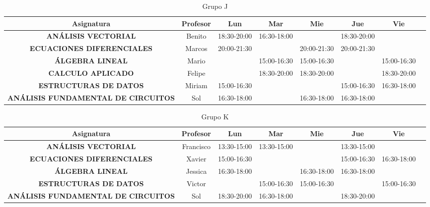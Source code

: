 \documentclass[10pt,letterpaper,twoside,openright]{article}
\begin{document}
	\begin{table}[h!]
		\centering
		\begin{adjustbox}{max width=\textwidth}
		\begin{tabular}{c||ccccccc}
		\textbf{Asignatura}                        & \textbf{Profesor} & \textbf{Lun} & \textbf{Mar} & \textbf{Mie} & \textbf{Jue} & \textbf{Vie} \\ \hline \hline
		\textbf{ANÁLISIS VECTORIAL}                & Benito   & 18:30-20:00 & 16:30-18:00 &             & 18:30-20:00 &             \\
		\textbf{ECUACIONES DIFERENCIALES}          & Marcos   & 20:00-21:30 &             & 20:00-21:30 & 20:00-21:30 &             \\
		\textbf{ÁLGEBRA LINEAL}                    & Mario    &             & 15:00-16:30 & 15:00-16:30 &             & 15:00-16:30 \\
		\textbf{CALCULO APLICADO}                  & Felipe   &             & 18:30-20:00 & 18:30-20:00 &             & 18:30-20:00 \\
		\textbf{ESTRUCTURAS DE DATOS}              & Miriam   & 15:00-16:30 &             &             & 15:00-16:30 & 16:30-18:00 \\
		\textbf{ANÁLISIS FUNDAMENTAL DE CIRCUITOS} & Sol      & 16:30-18:00 &             & 16:30-18:00 & 16:30-18:00 &            
		\end{tabular}
		\end{adjustbox}
		\caption{Grupo J}
		\label{tab:grupo_j}
	\end{table}

	\begin{table}[h!]
		\centering
		\begin{adjustbox}{max width=\textwidth}
		\begin{tabular}{c||ccccccc}
		\textbf{Asignatura}                        & \textbf{Profesor} & \textbf{Lun} & \textbf{Mar} & \textbf{Mie} & \textbf{Jue} & \textbf{Vie} \\ \hline \hline
		\textbf{ANÁLISIS VECTORIAL}                & Francisco & 13:30-15:00 & 13:30-15:00 &             & 13:30-15:00 &             \\
		\textbf{ECUACIONES DIFERENCIALES}          & Xavier    & 15:00-16:30 &             &             & 15:00-16:30 & 16:30-18:00 \\
		\textbf{ÁLGEBRA LINEAL}                    & Jessica   & 16:30-18:00 &             & 16:30-18:00 & 16:30-18:00 &             \\
		\textbf{ESTRUCTURAS DE DATOS}              & Victor    &             & 15:00-16:30 & 15:00-16:30 &             & 15:00-16:30 \\
		\textbf{ANÁLISIS FUNDAMENTAL DE CIRCUITOS} & Sol       & 18:30-20:00 & 16:30-18:00 &             & 18:30-20:00 &            
		\end{tabular}
		\end{adjustbox}
		\caption{Grupo K}
		\label{tab:grupo_k}
	\end{table}
\end{document}
